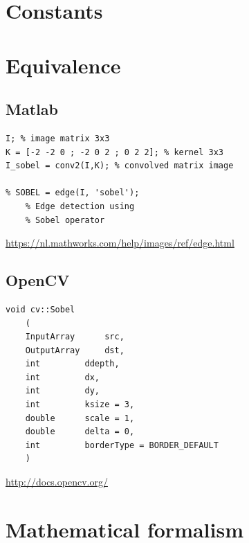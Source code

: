 \documentclass[12pt,a4paper]{article}
\begin{document}
\vspace{0.5cm}

\section*{Constants}


\newpage

\section*{Equivalence}
\subsection*{Matlab}

\lstset{language=Matlab}
\begin{lstlisting}
I; % image matrix 3x3
K = [-2 -2 0 ; -2 0 2 ; 0 2 2]; % kernel 3x3
I_sobel = conv2(I,K); % convolved matrix image 

% SOBEL = edge(I, 'sobel'); 
	% Edge detection using 
	% Sobel operator

\end{lstlisting}

\url{https://nl.mathworks.com/help/images/ref/edge.html}


\subsection*{OpenCV}

\lstset{language=C++}
\begin{lstlisting}
void cv::Sobel
	( 	
	InputArray  	src,
	OutputArray  	dst,
	int  		ddepth,
	int  		dx,
	int  		dy,
	int  		ksize = 3,
	double  	scale = 1,
	double  	delta = 0,
	int  		borderType = BORDER_DEFAULT 
	) 	

\end{lstlisting}

\url{http://docs.opencv.org/}

\section*{Mathematical formalism}
\end{document}
